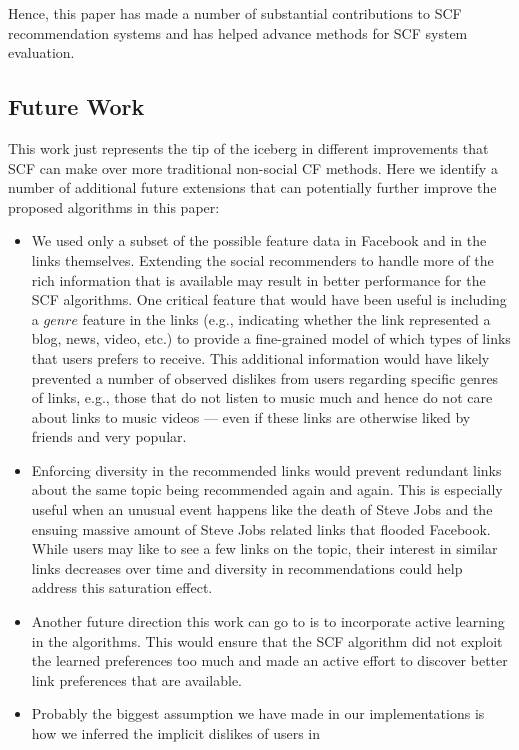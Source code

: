 Hence, this paper has made a number of substantial contributions to
SCF recommendation systems and has helped advance methods for
SCF system evaluation.  

\subsection{Future Work}

This work just represents the tip of the iceberg in different
improvements that SCF can make over more traditional non-social CF
methods.  Here we identify a number of additional future extensions
that can potentially further improve the proposed algorithms in this paper:

\begin{itemize}
\item We used only a subset of the possible feature data in Facebook
and in the links themselves. Extending the social recommenders to
handle more of the rich information that is available may result in
better performance for the SCF algorithms. One critical feature that
would have been useful is including a $\mathit{genre}$ feature in the
links (e.g., indicating whether the link represented a blog, news,
video, etc.)  to provide a fine-grained model of which types of links
that users prefers to receive.  This additional information would have
likely prevented a number of observed dislikes from users regarding
specific genres of links, e.g., those that do not listen to
music much and hence do not care about links to music videos --- even
if these links are otherwise liked by friends and very popular.
\item Enforcing diversity in the recommended links would prevent
redundant links about the same topic being recommended again and
again. This is especially useful when an unusual event happens like
the death of Steve Jobs and the ensuing massive amount of Steve Jobs
related links that flooded Facebook.  While users may like to see a
few links on the topic, their interest in similar links decreases over
time and diversity in recommendations could help address this
saturation effect.
\item Another future direction this work can go to is to incorporate
active learning in the algorithms.  This would ensure that the SCF
algorithm did not exploit the learned preferences too much and made an
active effort to discover better link preferences that are available.
\item Probably the biggest assumption we have made in our
implementations is how we inferred the implicit dislikes of users in

\end{itemize}

